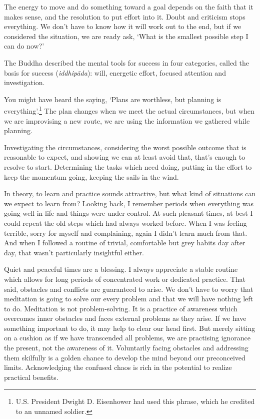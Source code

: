 
The energy to move and do something toward a goal depends on the faith
that it makes sense, and the resolution to put effort into it. Doubt and
criticism stops everything. We don't have to know how it will work out
to the end, but if we considered the situation, we are ready ask, `What
is the smallest possible step I can do now?'

The Buddha described the mental tools for success in four categories,
called the basis for success (\emph{iddhipāda}): will, energetic effort,
focused attention and investigation.

You might have heard the saying, `Plans are worthless, but planning is
everything'.\footnote{U.S. President Dwight D. Eisenhower had used this
  phrase, which he credited to an unnamed soldier.} The plan changes
when we meet the actual circumstances, but when we are improvising a new
route, we are using the information we gathered while planning.

Investigating the circumstances, considering the worst possible outcome
that is reasonable to expect, and showing we can at least avoid that,
that's enough to resolve to start. Determining the tasks which need
doing, putting in the effort to keep the momentum going, keeping the
sails in the wind.


In theory, to learn and practice sounds attractive, but what kind of
situations can we expect to learn from? Looking back, I remember periods
when everything was going well in life and things were under control. At
such pleasant times, at best I could repeat the old steps which had
always worked before. When I was feeling terrible, sorry for myself and
complaining, again I didn't learn much from that. And when I followed a
routine of trivial, comfortable but grey habits day after day, that
wasn't particularly insightful either.

Quiet and peaceful times are a blessing. I always appreciate a stable
routine which allows for long periods of concentrated work or dedicated
practice. That said, obstacles and conflicts are guaranteed to arise. We
don't have to worry that meditation is going to solve our every problem
and that we will have nothing left to do. Meditation is not
problem-solving. It is a practice of awareness which overcomes inner
obstacles and faces external problems as they arise. If we have
something important to do, it may help to clear our head first. But
merely sitting on a cushion as if we have transcended all problems, we
are practising ignorance the present, not the awareness of it.
Voluntarily facing obstacles and addressing them skilfully is a golden
chance to develop the mind beyond our preconceived limits. Acknowledging
the confused chaos is rich in the potential to realize practical
benefits.

